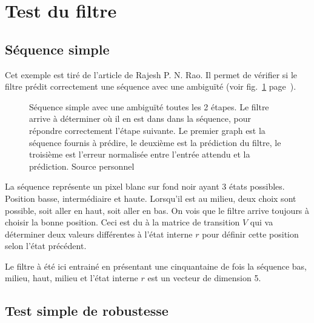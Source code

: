 
\section{Test du filtre} %
\label{sec:Test du filtre}

\subsection{Séquence simple} %
\label{sub:Sequence simple}

Cet exemple est tiré de l'article de Rajesh P. N. Rao. Il permet de vérifier si
le filtre prédit correctement une séquence avec une ambiguïté (voir
fig.~\ref{fig:sequence_simple} page~\pageref{fig:sequence_simple}).

\begin{figure}[ht]
   \begin{center}
   \end{center}
   \caption[Prédiction de séquence simple]{Séquence simple avec une ambiguïté
   toutes les 2 étapes. Le filtre arrive à déterminer où il en est dans dans la
   séquence, pour répondre correctement l'étape suivante. Le premier graph est
   la séquence fournis à prédire, le deuxième est la prédiction du filtre, le
   troisième est l'erreur normalisée entre l'entrée attendu et la prédiction.
   Source personnel}
   \label{fig:sequence_simple}
\end{figure}

La séquence représente un pixel blanc sur fond noir ayant 3 états possibles.
Position basse, intermédiaire et haute. Lorsqu'il est au milieu, deux choix sont
possible, soit aller en haut, soit aller en bas. On vois que le filtre arrive
toujours à choisir la bonne position. Ceci est du à la matrice de transition
$V$ qui va déterminer deux valeurs différentes à l'état interne $r$ pour définir
cette position selon l'état précédent\cite{Rao1999}.

Le filtre à été ici entrainé en présentant une cinquantaine de fois la séquence
bas, milieu, haut, milieu et l'état interne $r$ est un vecteur de dimension 5.


\subsection{Test simple de robustesse} %
\label{sub:Test simple de robustesse}

